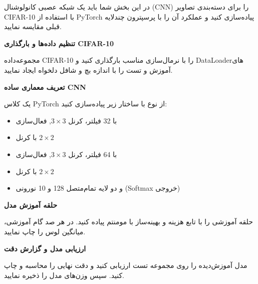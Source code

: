 \documentclass[12pt]{exam}
\begin{document}
	
	\vspace{1em}
	
	در این بخش شما باید یک شبکه عصبی کانولوشنال (CNN) را برای دسته‌بندی تصاویر CIFAR-10 با استفاده از PyTorch پیاده‌سازی کنید و عملکرد آن را با پرسپترون چندلایه قبلی مقایسه نمایید.
	
	\begin{questions}
		
		\question
		\textbf{تنظیم داده‌ها و بارگذاری CIFAR-10}
		
		مجموعه‌داده CIFAR-10 را با نرمال‌سازی مناسب بارگذاری کنید و DataLoader‌‌های آموزش و تست را با اندازه بچ و شافل دلخواه ایجاد نمایید.
		
		
		
		
		\question
		\textbf{تعریف معماری ساده CNN}
		
		یک کلاس PyTorch از نوع  با ساختار زیر پیاده‌سازی کنید:
		\begin{itemize}
			\item {} با 32 فیلتر، کرنل $3\times3$, فعال‌سازی 
			\item {} با کرنل $2\times2$
			\item {} با 64 فیلتر، کرنل $3\times3$, فعال‌سازی 
			\item {} با کرنل $2\times2$
			\item {} و دو لایه تمام‌متصل 128 و 10 نورونی (Softmax خروجی)
		\end{itemize}
		
		
		
		
		\question
		\textbf{حلقه آموزش مدل}
		
		حلقه آموزشی را با تابع هزینه  و بهینه‌ساز  با مومنتم پیاده کنید. در هر صد گام آموزشی، میانگین لوس را چاپ نمایید.
		
		
		
		
		\question
		\textbf{ارزیابی مدل و گزارش دقت}
		
		مدل آموزش‌دیده را روی مجموعه تست ارزیابی کنید و دقت نهایی را محاسبه و چاپ کنید. سپس وزن‌های مدل را ذخیره نمایید.
		
		
		

\end{questions}
\end{document}
